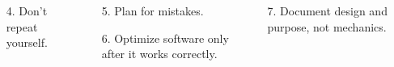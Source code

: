 \documentclass{beamer}
\begin{document}
\begin{frame}[t]
\begin{columns}
\begin{column}{.23\linewidth}
            \begin{block}{}
                \begin{minipage}[t][\blockheight][t]{\linewidth}
                    \begin{enumerate}
                        \item[4.] Don't repeat yourself.
                    \end{enumerate}
                \end{minipage}
            \end{block}
        \end{column}
        \begin{column}{.23\linewidth}
            \begin{block}{}
                \begin{minipage}[t][\blockheight][t]{\linewidth}
                    \begin{enumerate}
                        \item[5.] Plan for mistakes.
                    \end{enumerate}
                \end{minipage}
            \end{block}
            \begin{block}{}
                \begin{minipage}[t][\blockheight][t]{\linewidth}
                    \begin{enumerate}
                        \item[6.] Optimize software only after it works correctly.
                    \end{enumerate}
                \end{minipage}
            \end{block}
        \end{column}
        \begin{column}{.23\linewidth}
            \begin{block}{}
                \begin{minipage}[t][\blockheight][t]{\linewidth}
                    \begin{enumerate}
                        \item[7.] Document design and purpose, not mechanics.

\end{enumerate}
\end{minipage}
\end{block}
\end{column}
\end{columns}
\end{frame}
\end{document}
